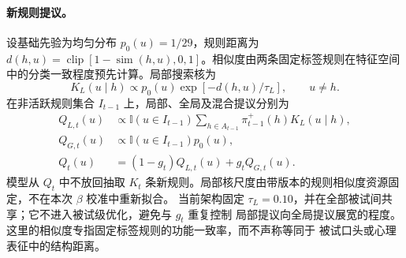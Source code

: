 \paragraph{新规则提议。}
设基础先验为均匀分布 $p_0(u)=1/29$，规则距离为
$d(h,u)=\operatorname{clip}[1-\operatorname{sim}(h,u),0,1]$。相似度由两条固定标签规则在特征空间中的分类一致程度预先计算。局部搜索核为
\begin{equation}
K_L(u\mid h)
\propto p_0(u)\exp[-d(h,u)/\tau_L],
\qquad u\neq h.
\label{eq:m0815-local-kernel}
\end{equation}
在非活跃规则集合 $I_{t-1}$ 上，局部、全局及混合提议分别为
\begin{align}
Q_{L,t}(u)
&\propto
\mathbb I(u\in I_{t-1})
\sum_{h\in A_{t-1}}\pi_{t-1}^{+}(h)K_L(u\mid h),
\nonumber\\
Q_{G,t}(u)
&\propto\mathbb I(u\in I_{t-1})p_0(u),
\nonumber\\
Q_t(u)
&=(1-g_t)Q_{L,t}(u)+g_tQ_{G,t}(u).
\label{eq:m0815-newcomer-proposal}
\end{align}
模型从 $Q_t$ 中不放回抽取 $K_t$ 条新规则。局部核尺度由带版本的规则相似度资源固定，不在本次 $\beta$ 校准中重新拟合。
当前架构固定 $\tau_L=0.10$，并在全部被试间共享；它不进入被试级优化，避免与 $g_t$ 重复控制
局部提议向全局提议展宽的程度。这里的相似度专指固定标签规则的功能一致率，而不声称等同于
被试口头或心理表征中的结构距离。

